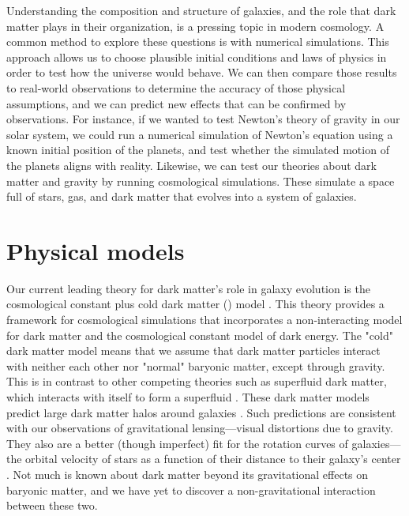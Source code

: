 
Understanding the composition and structure of galaxies, and the role that dark matter plays in their organization, is a pressing topic in modern cosmology. A common method to explore these questions is with numerical simulations. This approach allows us to choose plausible initial conditions and laws of physics in order to test how the universe would behave. We can then compare those results to real-world observations to determine the accuracy of those physical assumptions, and we can predict new effects that can be confirmed by observations. For instance, if we wanted to test Newton's theory of gravity in our solar system, we could run a numerical simulation of Newton's equation using a known initial position of the planets, and test whether the simulated motion of the planets aligns with reality. Likewise, we can test our theories about dark matter and gravity by running cosmological simulations. These simulate a space full of stars, gas, and dark matter that evolves into a system of galaxies.

\section{Physical models}

Our current leading theory for dark matter's role in galaxy evolution is the cosmological constant plus cold dark matter (\lcdm) model \citep{whiteCoreCondensationHeavy1978}. This theory provides a framework for cosmological simulations that incorporates a non-interacting model for dark matter and the cosmological constant model of dark energy. The "cold" dark matter model means that we assume that dark matter particles interact with neither each other nor "normal" baryonic matter, except through gravity. This is in contrast to other competing theories such as superfluid dark matter, which interacts with itself to form a superfluid \citep{delucaSuperfluidDarkMatter2023}. These dark matter models predict large dark matter halos around galaxies \citep{feldmannFIREboxSimulatingGalaxies2022}. Such predictions are consistent with our observations of gravitational lensing---visual distortions due to gravity. They also are a better (though imperfect) fit for the rotation curves of galaxies---the orbital velocity of stars as a function of their distance to their galaxy's center \citep{salesBaryonicSolutionsChallenges2022}. Not much is known about dark matter beyond its gravitational effects on baryonic matter, and we have yet to discover a non-gravitational interaction between these two.

